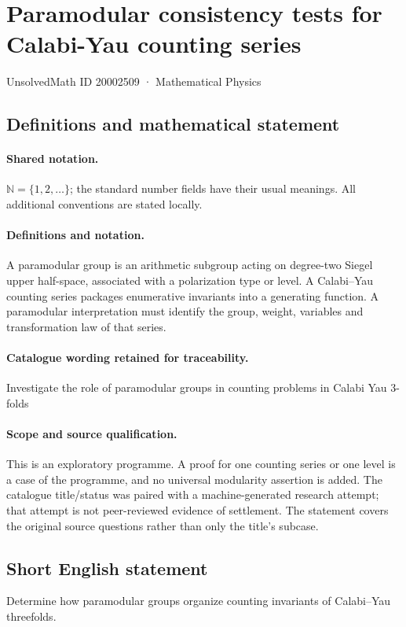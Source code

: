 \documentclass[11pt]{article}
\begin{document}
\setcounter{section}{20002508}
\section{Paramodular consistency tests for Calabi-Yau counting series}\label{20002509}
{\small UnsolvedMath ID 20002509 · Mathematical Physics}
\subsection{Definitions and mathematical statement}

\paragraph{Shared notation.}$\mathbb N=\{1,2,\ldots\}$; the standard number fields have their usual meanings. All additional conventions are stated locally.


\paragraph{Definitions and notation.}A paramodular group is an arithmetic subgroup acting on degree-two Siegel upper half-space, associated with a polarization type or level. A Calabi--Yau counting series packages enumerative invariants into a generating function. A paramodular interpretation must identify the group, weight, variables and transformation law of that series.

\paragraph{Catalogue wording retained for traceability.}
Investigate the role of paramodular groups in counting problems in Calabi Yau 3-folds
\paragraph{Scope and source qualification.}This is an exploratory programme. A proof for one counting series or one level is a case of the programme, and no universal modularity assertion is added. The catalogue title/status was paired with a machine-generated research attempt; that attempt is not peer-reviewed evidence of settlement. The statement covers the original source questions rather than only the title’s subcase.
\subsection{Short English statement}
Determine how paramodular groups organize counting invariants of Calabi–Yau threefolds.
\end{document}
